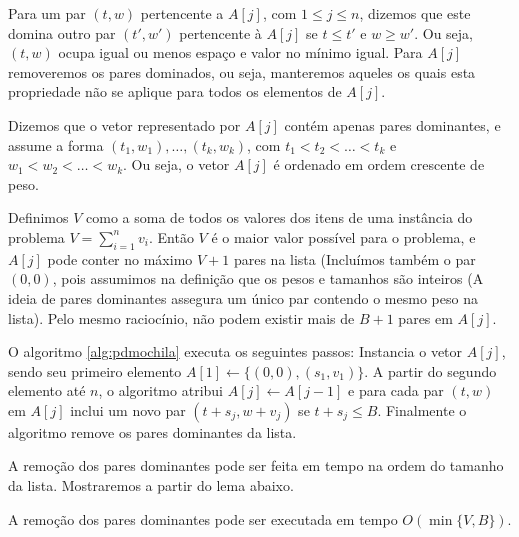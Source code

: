 Para um par $(t,w)$ pertencente a $A[j]$, com $ 1 \leq j \leq n$, dizemos que este domina outro par $(t',w')$ pertencente à $A[j]$ se $t \leq t'$ e $w \geq w'$. Ou seja, $(t,w)$ ocupa igual ou menos espaço e valor no mínimo igual. Para $A[j]$ removeremos os pares dominados, ou seja, manteremos aqueles os quais esta propriedade não se aplique para todos os elementos de $A[j]$.

Dizemos que o vetor representado por $A[j]$ contém apenas pares dominantes, e assume a forma $(t_1,w_1), \ldots, (t_k,w_k)$, com $t_1 < t_2 < \ldots < t_k$ e $w_1 < w_2 < \ldots < w_k$. Ou seja, o vetor $A[j]$ é ordenado em ordem crescente de peso.

Definimos $V$ como a soma de todos os valores dos itens de uma instância do problema $V= \sum_{i=1}^{n} v_i$. Então $V$ é o maior valor possível para o problema, e $A[j]$ pode conter no máximo $V+1$ pares na lista (Incluímos também o par $(0,0)$, pois assumimos na definição que os pesos e tamanhos são inteiros (A ideia de pares dominantes assegura um único par contendo o mesmo peso na lista). Pelo mesmo raciocínio, não podem existir mais de $B+1$ pares em $A[j]$.

O algoritmo \ref{alg:pdmochila} executa os seguintes passos: Instancia o vetor $A[j]$, sendo seu primeiro elemento $A[1] \leftarrow \{(0,0),(s_1,v_1)\}$. A partir do segundo elemento até $n$, o algoritmo atribui $A[j] \leftarrow A[j-1]$ e para cada par $(t,w)$ em $A[j]$ inclui um novo par $(t+s_j,w+v_j)$ se $t+s_j \leq B$. Finalmente o algoritmo remove os pares dominantes da lista.

A remoção dos pares dominantes pode ser feita em tempo na ordem do tamanho da lista. Mostraremos a partir do lema abaixo.

\begin{lema}
\label{lem:remparesdom}
A remoção dos pares dominantes pode ser executada em tempo $O(\min\{V,B\})$.
\end{lema}

